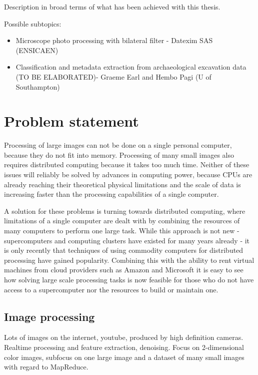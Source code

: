 \documentclass [12pt,a4paper]{report}
\begin{document}
Description in broad terms of what has been achieved with this thesis.

Possible subtopics:
\begin{itemize}
	\item Microscope photo processing with bilateral filter - Datexim SAS (ENSICAEN)
	\item Classification and metadata extraction from archaeological excavation data (TO BE ELABORATED)- Graeme Earl and Hembo Pagi (U of Southampton)
	
\end{itemize}

\section{Problem statement}

Processing of large images can not be done on a single personal computer, because they do not fit into memory. Processing of many small images also requires distributed computing because it takes too much time. Neither of these issues will reliably be solved by advances in computing power, because CPUs are already reaching their theoretical physical limitations and the scale of data is increasing faster than the processing capabilities of a single computer.

A solution for these problems is turning towards distributed computing, where limitations of a single computer are dealt with by combining the resources of many computers to perform one large task. While this approach is not new - supercomputers and computing clusters have existed for many years already - it is only recently that techniques of using commodity computers for distributed processing have gained popularity. Combining this with the ability to rent virtual machines from cloud providers such as Amazon and Microsoft it is easy to see how solving large scale processing tasks is now feasible for those who do not have access to a supercomputer nor the resources to build or maintain one.

\subsection{Image processing}

Lots of images on the internet, youtube, produced by high definition cameras. Realtime processing and feature extraction, denoising. Focus on 2-dimensional color images, subfocus on one large image and a dataset of many small images with regard to MapReduce.
\end{document}
